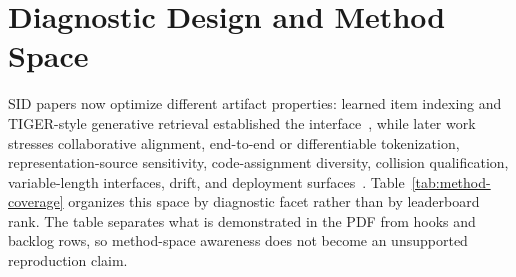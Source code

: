 \section{Diagnostic Design and Method Space}

SID papers now optimize different artifact properties: learned item indexing
and TIGER-style generative retrieval established the interface~\cite{hua2023indexids,rajput2023tiger},
while later work stresses collaborative alignment, end-to-end or
differentiable tokenization, representation-source sensitivity,
code-assignment diversity, collision qualification, variable-length
interfaces, drift, and deployment surfaces~\cite{zheng2023lcrec,zhu2024cost,wang2024letter,liu2024elit,fu2026diger,qiao2026textasvision,hu2026quasid,pan2026adasid,cheng2026capsid,baikalov2026staleness,ju2026snapchatsid}.
Table~\ref{tab:method-coverage} organizes this space by diagnostic facet rather
than by leaderboard rank. The table separates what is demonstrated in the PDF
from hooks and backlog rows, so method-space awareness does not become an
unsupported reproduction claim.


